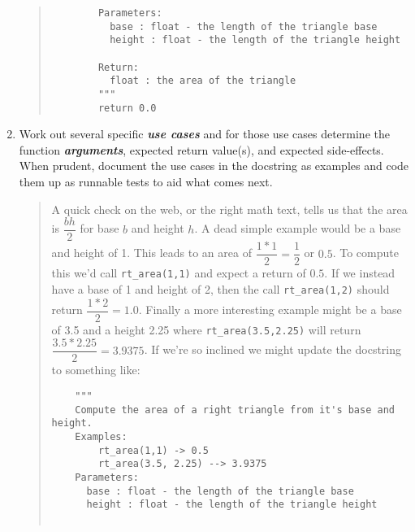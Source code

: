 \documentclass[nobib]{tufte-handout}
\begin{document}
\begin{enumerate}
\begin{quote}
\begin{verbatim}
        Parameters:
          base : float - the length of the triangle base 
          height : float - the length of the triangle height

        Return:
          float : the area of the triangle 
        """
        return 0.0
    \end{verbatim}
  \end{quote}
  \item Work out several specific \textit{\textbf{use cases}} and for those use cases determine the function \textit{\textbf{arguments}}, expected return value(s), and expected side-effects. When prudent, document the use cases in the docstring as examples and code them up as runnable tests to aid what comes next.
  \begin{quote}
  A quick check on the web, or the right math text, tells us that the area is $\dfrac{bh}{2}$ for base $b$ and height $h$. A dead simple example would be a base and height of 1. This leads to an area of $\dfrac{1*1}{2} = \dfrac{1}{2}$ or $0.5$.  To compute this we'd call \texttt{rt_area(1,1)} and expect a return of $0.5$. If we instead have a base of 1 and height of 2, then the call \texttt{rt_area(1,2)} should return $\dfrac{1*2}{2} = 1.0$. Finally a more interesting example might be a base of 3.5 and a height 2.25 where \texttt{rt_area(3.5,2.25)} will return $\dfrac{3.5*2.25}{2} = 3.9375$. If we're so inclined we might update the docstring to something like: 
  \begin{verbatim}
    """
    Compute the area of a right triangle from it's base and height. 
    Examples:  
        rt_area(1,1) -> 0.5
        rt_area(3.5, 2.25) --> 3.9375
    Parameters:
      base : float - the length of the triangle base 
      height : float - the length of the triangle height


\end{verbatim}
\end{quote}
\end{enumerate}
\end{document}
